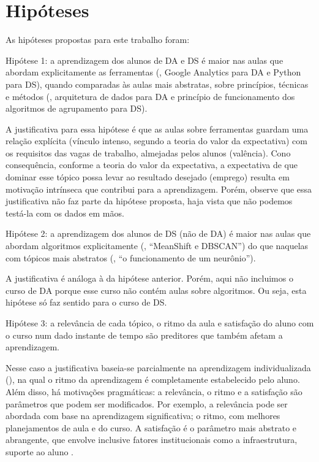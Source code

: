 \section{Hipóteses}
\label{sec:hipóteses}

As hipóteses propostas para este trabalho foram:
\begin{compactdesc}
	\item[Hipótese 1:] a aprendizagem dos alunos de DA e DS é maior nas aulas que abordam explicitamente as ferramentas (\eg, Google Analytics para DA e Python para DS), quando comparadas às aulas mais abstratas, sobre princípios, técnicas e métodos (\eg, arquitetura de dados para DA e princípio de funcionamento dos algoritmos de agrupamento para DS).

	A justificativa para essa hipótese é que as aulas sobre ferramentas guardam uma relação explícita (vínculo intenso, segundo a teoria do valor da expectativa) com os requisitos das vagas de trabalho, almejadas pelos alunos (valência).
	Cono consequência, conforme a teoria do valor da expectativa, a expectativa de que dominar esse tópico possa levar ao resultado desejado (emprego) resulta em motivação intrínseca que contribui para a aprendizagem.
	Porém, observe que essa justificativa não faz parte da hipótese proposta, haja vista que não podemos testá-la com os dados em mãos.

	\item[Hipótese 2:] a aprendizagem dos alunos de DS (não de DA) é maior nas aulas que abordam algoritmos explicitamente (\eg, ``MeanShift e DBSCAN'') do que naquelas com tópicos mais abstratos (\eg, ``o funcionamento de um neurônio'').
	
	A justificativa é análoga à da hipótese anterior.
	Porém, aqui não incluimos o curso de DA porque esse curso não contém aulas sobre algoritmos.
	Ou seja, esta hipótese só faz sentido para o curso de DS.

	\item[Hipótese 3:] a relevância de cada tópico, o ritmo da aula e satisfação do aluno com o curso num dado instante de tempo são preditores que também afetam a aprendizagem.

	Nesse caso a justificativa baseia-se parcialmente na aprendizagem individualizada (), na qual o ritmo da aprendizagem é completamente estabelecido pelo aluno.
	Além disso, há motivações pragmáticas: a relevância, o ritmo e a satisfação são parâmetros que podem ser modificados.
	Por exemplo, a relevância pode ser abordada com base na aprendizagem significativa; o ritmo, com melhores planejamentos de aula e do curso.
	A satisfação é o parâmetro mais abstrato e abrangente, que envolve inclusive fatores institucionais como a infraestrutura, suporte ao aluno \etc.
\end{compactdesc}
